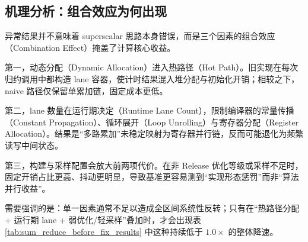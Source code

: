 \subsection{机理分析：组合效应为何出现}
异常结果并不意味着 superscalar 思路本身错误，而是三个因素的组合效应（Combination Effect）掩盖了计算核心收益。

第一，动态分配（Dynamic Allocation）进入热路径（Hot Path）。旧实现在每次归约调用中都构造 lane 容器，使计时结果混入堆分配与初始化开销；相较之下，naive 路径仅保留单累加链，固定成本更低。

第二，lane 数量在运行期决定（Runtime Lane Count），限制编译器的常量传播（Constant Propagation）、循环展开（Loop Unrolling）与寄存器分配（Register Allocation）。结果是“多路累加”未稳定映射为寄存器并行链，反而可能退化为频繁读写中间状态。

第三，构建与采样配置会放大前两项代价。在非 Release 优化等级或采样不足时，固定开销占比更高、抖动更明显，导致基准更容易测到“实现形态惩罚”而非“算法并行收益”。

需要强调的是：单一因素通常不足以造成全区间系统性反转；只有在“热路径分配 + 运行期 lane + 弱优化/轻采样”叠加时，才会出现表 \ref{tab:sum_reduce_before_fix_results} 中这种持续低于 $1.0\times$ 的整体降速。

